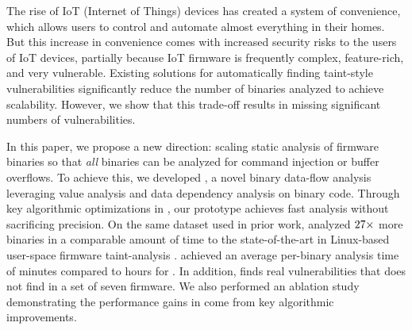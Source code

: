 The rise of IoT (Internet of Things) devices has created a system of convenience, which allows users to control and automate almost everything in their homes.
But this increase in convenience comes with increased security risks to the users of IoT devices, partially because IoT firmware is frequently complex, feature-rich, and very vulnerable.
Existing solutions for automatically finding taint-style vulnerabilities significantly reduce the number of binaries analyzed to achieve scalability.
However, we show that this trade-off results in missing significant numbers of vulnerabilities.

In this paper, we propose a new direction: scaling static analysis of firmware binaries so that \emph{all} binaries can be analyzed for command injection or buffer overflows.
To achieve this, we developed \rda, a novel binary data-flow analysis leveraging value analysis and data dependency analysis on binary code.
Through key algorithmic optimizations in \rda, our prototype \mango achieves fast analysis without sacrificing precision.
On the same dataset used in prior work, \mango analyzed $27\times$ more binaries in a comparable amount of time to the state-of-the-art in Linux-based user-space firmware taint-analysis \satc.
\mango achieved an average per-binary analysis time of \mangoavgtime minutes compared to \SaTCTimePerBin hours for \satc.
In addition, \mango finds \satcFalseNegatives real vulnerabilities that \satc does not find in a set of seven firmware.
We also performed an ablation study demonstrating the performance gains in \mango come from key algorithmic improvements.
